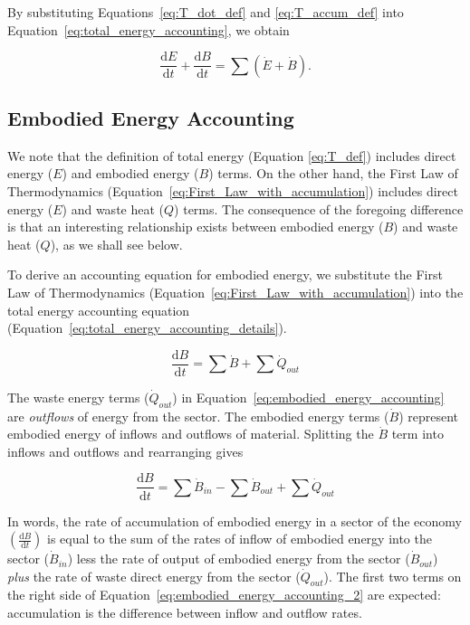 By substituting Equations~\ref{eq:T_dot_def} and
\ref{eq:T_accum_def} into 
Equation~\ref{eq:total_energy_accounting},
we obtain

\begin{equation} \label{eq:total_energy_accounting_details}
	\frac{\mathrm{d}E}{\mathrm{d}t} 
	+ \frac{\mathrm{d}B}{\mathrm{d}t}
	= \sum{\left( \dot{E} 
			+ \dot{B} \right)}.
\end{equation}


\subsection{Embodied Energy Accounting}

We note that the definition of total energy 
(Equation \ref{eq:T_def}) includes direct energy ($E$) 
and embodied energy ($B$) terms. 
On the other hand, the First Law of Thermodynamics 
(Equation~\ref{eq:First_Law_with_accumulation})
includes direct energy ($E$) and waste heat ($Q$) terms. 
The consequence of the foregoing difference is that 
an interesting relationship exists between embodied energy ($B$) 
and waste heat ($Q$), as we shall see below. 

To derive an accounting equation for embodied energy, we substitute the 
First Law of Thermodynamics (Equation~\ref{eq:First_Law_with_accumulation})
into the total energy accounting equation (Equation~\ref{eq:total_energy_accounting_details}).

\begin{equation} \label{eq:embodied_energy_accounting}
	\frac{\mathrm{d}B}{\mathrm{d}t}
	= \sum \dot{B} 
	+ \sum \dot{Q}_{out}
\end{equation}

The waste energy terms ($\dot{Q}_{out}$) 
in Equation~\ref{eq:embodied_energy_accounting}
are \emph{outflows} of energy from the sector. 
The embodied energy 
terms ($\dot{B}$) represent embodied energy of inflows
and outflows of material. Splitting the $\dot{B}$ term
into inflows and outflows and rearranging gives

\begin{equation} \label{eq:embodied_energy_accounting_2}
	\frac{\mathrm{d}B}{\mathrm{d}t}
	= \sum \dot{B}_{in}
	- \sum \dot{B}_{out} 
	+ \sum \dot{Q}_{out}
\end{equation}

In words, the rate of accumulation of embodied energy 
in a sector of the economy 
$\left( \frac{\mathrm{d}B}{\mathrm{d}t} \right)$ 
is equal to the sum of the rates of 
inflow of embodied energy into the sector 
	($\dot{B}_{in}$) 
less the rate of output of embodied energy from the sector 
	($\dot{B}_{out}$) 
\emph{plus} the rate of waste direct energy from the sector 
	($\dot{Q}_{out}$). 
The first two terms on the right side of
Equation~\ref{eq:embodied_energy_accounting_2} are expected: 
accumulation is the difference between inflow and outflow rates. 


